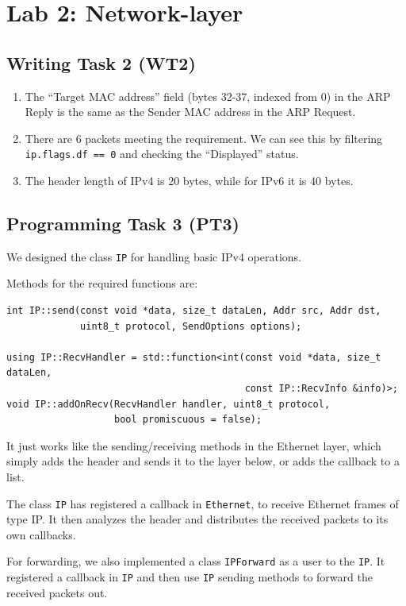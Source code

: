 \documentclass[a4paper]{article}
\begin{document}
  \section{Lab 2: Network-layer}

  \subsection{Writing Task 2 (WT2)}

  \begin{enumerate}
    \item The ``Target MAC address'' field (bytes 32-37, indexed from 0) in the ARP Reply is the same as the Sender MAC address in the ARP Request.
    \item There are 6 packets meeting the requirement. We can see this by filtering \texttt{ip.flags.df == 0} and checking the ``Displayed'' status.
    \item The header length of IPv4 is 20 bytes, while for IPv6 it is 40 bytes.
  \end{enumerate}

  \subsection{Programming Task 3 (PT3)}

  We designed the class \texttt{IP} for handling basic IPv4 operations.

  Methods for the required functions are:
  \begin{verbatim}
int IP::send(const void *data, size_t dataLen, Addr src, Addr dst,
             uint8_t protocol, SendOptions options);

using IP::RecvHandler = std::function<int(const void *data, size_t dataLen,
                                          const IP::RecvInfo &info)>;
void IP::addOnRecv(RecvHandler handler, uint8_t protocol,
                   bool promiscuous = false);
  \end{verbatim}

  It just works like the sending/receiving methods in the Ethernet layer, which simply adds the header and sends it to the layer below, or adds the callback to a list.

  The class \texttt{IP} has registered a callback in \texttt{Ethernet}, to receive Ethernet frames of type IP.
  It then analyzes the header and distributes the received packets to its own callbacks.

  For forwarding, we also implemented a class \texttt{IPForward} as a user to the \texttt{IP}.
  It registered a callback in \texttt{IP} and then use \texttt{IP} sending methods to forward the received packets out.
\end{document}
